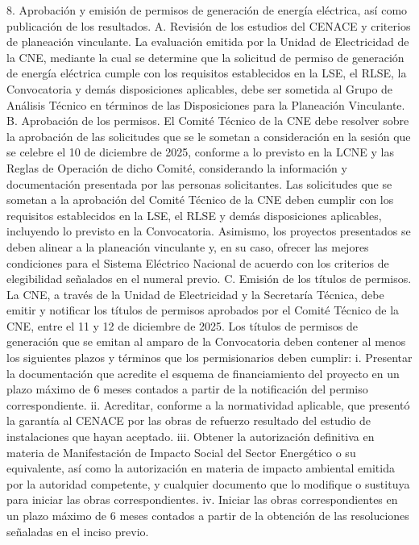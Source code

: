 8. Aprobación y emisión de permisos de generación de energía eléctrica, así como publicación de los resultados.
A. Revisión de los estudios del CENACE y criterios de planeación vinculante.
La evaluación emitida por la Unidad de Electricidad de la CNE, mediante la cual se determine que la solicitud de permiso de generación de energía eléctrica cumple con los requisitos establecidos en la LSE, el RLSE, la Convocatoria y demás disposiciones aplicables, debe ser sometida al Grupo de Análisis Técnico en términos de las Disposiciones para la Planeación Vinculante.
B. Aprobación de los permisos.
El Comité Técnico de la CNE debe resolver sobre la aprobación de las solicitudes que se le sometan a consideración en la sesión que se celebre el 10 de diciembre de 2025, conforme a lo previsto en la LCNE y las Reglas de Operación de dicho Comité, considerando la información y documentación presentada por las personas solicitantes.
Las solicitudes que se sometan a la aprobación del Comité Técnico de la CNE deben cumplir con los requisitos establecidos en la LSE, el RLSE y demás disposiciones aplicables, incluyendo lo previsto en la Convocatoria. Asimismo, los proyectos presentados se deben alinear a la planeación vinculante y, en su caso, ofrecer las mejores condiciones para el Sistema Eléctrico Nacional de acuerdo con los criterios de elegibilidad señalados en el numeral previo.
C. Emisión de los títulos de permisos.
La CNE, a través de la Unidad de Electricidad y la Secretaría Técnica, debe emitir y notificar los títulos de permisos aprobados por el Comité Técnico de la CNE, entre el 11 y 12 de diciembre de 2025.
Los títulos de permisos de generación que se emitan al amparo de la Convocatoria deben contener al menos los siguientes plazos y términos que los permisionarios deben cumplir:
i.	Presentar la documentación que acredite el esquema de financiamiento del proyecto en un plazo máximo de 6 meses contados a partir de la notificación del permiso correspondiente.
ii.	Acreditar, conforme a la normatividad aplicable, que presentó la garantía al CENACE por las obras de refuerzo resultado del estudio de instalaciones que hayan aceptado.
iii.	Obtener la autorización definitiva en materia de Manifestación de Impacto Social del Sector Energético o su equivalente, así como la autorización en materia de impacto ambiental emitida por la autoridad competente, y cualquier documento que lo modifique o sustituya para iniciar las obras correspondientes.
iv.	Iniciar las obras correspondientes en un plazo máximo de 6 meses contados a partir de la obtención de las resoluciones señaladas en el inciso previo.
